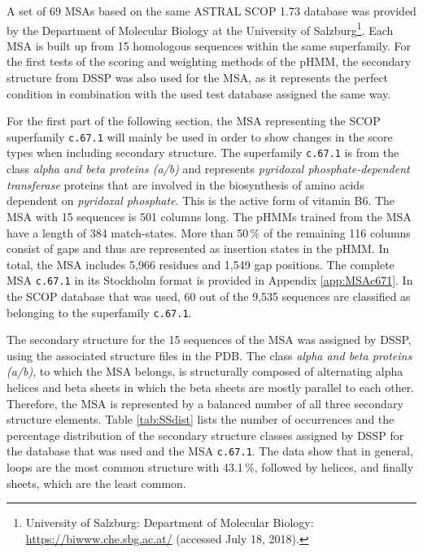 A set of 69 \acp{MSA} based on the  same ASTRAL \ac{SCOP} 1.73 database was provided by the Department of Molecular Biology at the University of Salzburg\footnote{University of Salzburg: Department of Molecular Biology: \url{https://biwww.che.sbg.ac.at/} (accessed July 18, 2018).}. Each MSA is built up from 15 homologous sequences within  the same superfamily. 
For the first tests of the scoring and weighting methods of the \ac{pHMM}, the secondary structure from \ac{DSSP} was also used for the \ac{MSA}, as it represents the perfect condition in combination with the used test database assigned the same way. 

For the first part of the following section, the \ac{MSA} representing the \ac{SCOP} superfamily \texttt{c.67.1} will mainly be used in order to show changes in the score types when including secondary structure. 
The superfamily \texttt{c.67.1} is from the class \textit{alpha and beta proteins (a/b)} and represents \textit{pyridoxal phosphate-dependent transferase} proteins that are involved in the biosynthesis of amino acids dependent on \textit{pyridoxal phosphate}. This is the active form of vitamin B6.  
The \ac{MSA} with 15 sequences is 501 columns long. The \acp{pHMM} trained from the \ac{MSA} have a length of 384 match-states. 
More than 50\,\% of the remaining 116 columns consist of gaps and thus are represented as insertion states in the \ac{pHMM}. 
In total, the \ac{MSA} includes 5,966 residues and 1,549 gap positions.
The complete \ac{MSA} \texttt{c.67.1} in its Stockholm format is provided in Appendix \ref{app:MSAc671}. 
In the SCOP database that was used, 60 out of the 9,535 sequences are classified as belonging to the superfamily \texttt{c.67.1}.

The secondary structure for the 15 sequences of the \ac{MSA} was assigned by DSSP, using the associated structure files in the \ac{PDB}. 
The class \textit{alpha and beta proteins (a/b)}, to which the \ac{MSA} belongs, is structurally composed of alternating alpha helices and beta sheets in which the beta sheets are mostly parallel to each other. Therefore,  the \ac{MSA} is represented by a balanced number of all three secondary structure elements.
Table \ref{tab:SSdist} lists the number of occurrences and the percentage distribution of the secondary structure classes assigned by \ac{DSSP}  for the  database that was used and the \ac{MSA} \texttt{c.67.1}. The data show that in general, loops are the most common structure with 43.1\,\%, followed by helices, and finally sheets, which are the least common. 

